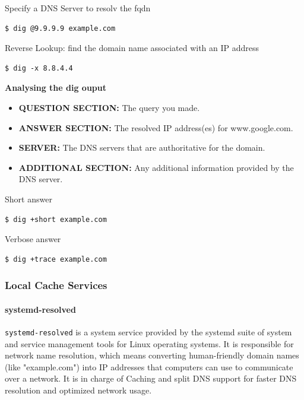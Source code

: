 \documentclass{article}
\newenvironment{codetemplate}[1][]{%
  \mybasecolorbox[#1]
  \itshape
}{%
  \endmybasecolorbox
}
\begin{document}
Specify a DNS Server to resolv the fqdn
\begin{codetemplate}{}
\begin{verbatim}
$ dig @9.9.9.9 example.com
\end{verbatim}
\end{codetemplate}

Reverse Lookup: find the domain name associated with an IP address
\begin{codetemplate}{}
\begin{verbatim}
$ dig -x 8.8.4.4
\end{verbatim}
\end{codetemplate}

\textbf{Analysing the dig ouput}
\begin{itemize}
    \item \textbf{QUESTION SECTION:} The query you made.
    \item \textbf{ANSWER SECTION:} The resolved IP address(es) for www.google.com.
    \item \textbf{SERVER:} The DNS servers that are authoritative for the domain.
    \item \textbf{ADDITIONAL SECTION:} Any additional information provided by the DNS server.
\end{itemize}

Short answer
\begin{codetemplate}{}
\begin{verbatim}
$ dig +short example.com
\end{verbatim}
\end{codetemplate}

Verbose answer
\begin{codetemplate}{}
\begin{verbatim}
$ dig +trace example.com
\end{verbatim}
\end{codetemplate}

\subsubsection{Local Cache Services}

\paragraph{systemd-resolved}

\verb+systemd-resolved+ is a system service provided by the systemd suite of system and service management tools for Linux operating systems. It is responsible for network name resolution, which means converting human-friendly domain names (like "example.com") into IP addresses that computers can use to communicate over a network. It is in charge of Caching and split DNS support for faster DNS resolution and optimized network usage.
\end{document}
